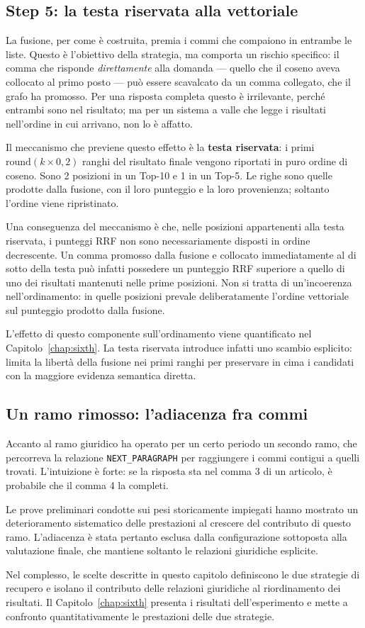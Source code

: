 \subsection{Step 5: la testa riservata alla vettoriale}
\label{sec:testa_riservata}

La fusione, per come è costruita, premia i commi che compaiono in entrambe le liste. Questo è l'obiettivo della strategia, ma comporta un rischio specifico: il comma che risponde \textit{direttamente} alla domanda --- quello che il coseno aveva collocato al primo posto --- può essere scavalcato da un comma collegato, che il grafo ha promosso. Per una risposta completa questo è irrilevante, perché entrambi sono nel risultato; ma per un sistema a valle che legge i risultati nell'ordine in cui arrivano, non lo è affatto.

Il meccanismo che previene questo effetto è la \textbf{testa riservata}: i primi $\mathrm{round}(k \times 0{,}2)$ ranghi del risultato finale vengono riportati in puro ordine di coseno. Sono 2 posizioni in un Top-10 e 1 in un Top-5. Le righe sono quelle prodotte dalla fusione, con il loro punteggio e la loro provenienza; soltanto l'ordine viene ripristinato.

Una conseguenza del meccanismo è che, nelle posizioni appartenenti alla testa riservata, i punteggi RRF non sono necessariamente disposti in ordine decrescente. Un comma promosso dalla fusione e collocato immediatamente al di sotto della testa può infatti possedere un punteggio RRF superiore a quello di uno dei risultati mantenuti nelle prime posizioni. Non si tratta di un'incoerenza nell'ordinamento: in quelle posizioni prevale deliberatamente l'ordine vettoriale sul punteggio prodotto dalla fusione.

L'effetto di questo componente sull'ordinamento viene quantificato nel Capitolo~\ref{chap:sixth}. La testa riservata introduce infatti uno scambio esplicito: limita la libertà della fusione nei primi ranghi per preservare in cima i candidati con la maggiore evidenza semantica diretta.


\subsection{Un ramo rimosso: l'adiacenza fra commi}

Accanto al ramo giuridico ha operato per un certo periodo un secondo ramo, che percorreva la relazione \texttt{NEXT\_PARAGRAPH} per raggiungere i commi contigui a quelli trovati. L'intuizione è forte: se la risposta sta nel comma 3 di un articolo, è probabile che il comma 4 la completi.

Le prove preliminari condotte sui pesi storicamente impiegati hanno mostrato un deterioramento sistematico delle prestazioni al crescere del contributo di questo ramo. L'adiacenza è stata pertanto esclusa dalla configurazione sottoposta alla valutazione finale, che mantiene soltanto le relazioni giuridiche esplicite.

Nel complesso, le scelte descritte in questo capitolo definiscono le due strategie di recupero e isolano il contributo delle relazioni giuridiche al riordinamento dei risultati. Il Capitolo~\ref{chap:sixth} presenta i risultati dell'esperimento e mette a confronto quantitativamente le prestazioni delle due strategie.
